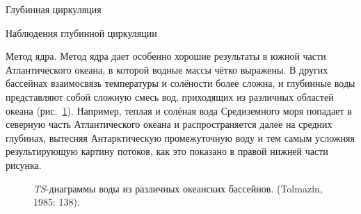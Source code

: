 \begin{chapter}{Глубинная циркуляция}
\begin{section}{Наблюдения глубинной циркуляции}
\begin{paragraph}{Метод ядра.}
Метод ядра дает особенно хорошие результаты в южной части Атлантического
океана, в которой водные массы чётко выражены. В других бассейнах 
взаимосвязь температуры и солёности более сложна, и глубинные воды
представляют собой сложную смесь вод, приходящих из различных областей 
океана (рис.~\ref{fig:TSplots}). Например, теплая и солёная вода Средиземного
моря попадает в северную часть Атлантического океана и распространяется далее
на средних глубинах, вытесняя Антарктическую промежуточную воду 
и тем самым усложняя результирующую картину потоков, как это показано
в правой нижней части рисунка.
%

\begin{figure}[t!]
\begin{centering}
\end{centering}
\caption{\emph{TS}-диаграммы воды из различных океанских бассейнов. 
(Tolmazin, 1985: 138).}
\label{fig:TSplots}
\end{figure}
%
%
\end{paragraph}


\end{section}
\end{chapter}

